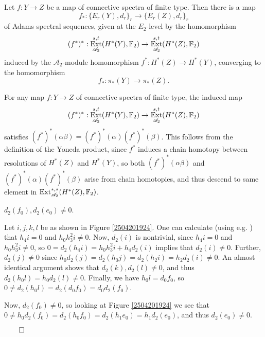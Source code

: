 \documentclass{MetricNotes2023}
\def\bb{\ensuremath\mathbb}
\def\A{\ensuremath{\mathscr{A}_2}}
\DeclareMathOperator{\Ext}{Ext}
\def\done{\begin{flushright}\vspace{-4.35ex}\(\qed\)\end{flushright}}
\begin{document}
\begin{theorem}\label{2504141019}
Let \(f : Y \to Z\) be a map of connective spectra of finite type. Then there is a map
\[f_* : \{E_r(Y), d_r\}_r \to \{E_r(Z), d_r\}_r\]
of Adams spectral sequences, given at the \(E_2\)-level by the homomorphism
\[(f^*)^* : \Ext_{\A}^{s,t}(H^*(Y), \bb{F}_2) \to \Ext^{s,t}_{\A}(H^*(Z), \bb{F}_2)\]
induced by the \(\A\)-module homomorphism \(f^* : H^*(Z)\to H^*(Y)\), converging to the homomorphism 
\[f_* : \pi_*(Y) \to \pi_*(Z).\]
\end{theorem}

\begin{remark}\label{2504211139}
For any map \(f : Y \to Z\) of connective spectra of finite type, the induced map 
\[(f^*)^* : \Ext_{\A}^{s,t}(H^*(Y), \bb{F}_2)\to \Ext^{s,t}_{\A}(H^*(Z), \bb{F}_2)\]
satisfies \((f^*)^*(\alpha \beta)=(f^*)^*(\alpha)(f^*)^*(\beta)\). This follows from the definition of the Yoneda product, since \(f^*\) induces a chain homotopy between resolutions of \(H^*(Z)\) and \(H^*(Y)\), so both \((f^*)^*(\alpha \beta)\) and \((f^*)^*(\alpha)(f^*)^*(\beta)\) arise from chain homotopies, and thus descend to same element in \(\Ext_{\A}^{*,*}(H^*(Z), \bb{F}_2)\).
\end{remark}

\begin{lemma}\label{2504192017}
\(d_2(f_0), d_2(e_0)\neq 0\).
\end{lemma}

\begin{ourproof}
Let \(i, j, k, l\) be as shown in Figure \ref{2504201924}. One can calculate (using e.g. \autocite{ext}) that \(h_4i=0\) and \(h_0h_3^2i\neq 0\). Now, \(d_2(i)\) is nontrivial, since \(h_4i=0\) and \(h_0h_3^2i\neq 0\), so \(0=d_2(h_4i)=h_0h_3^2i+h_4d_2(i)\) implies that \(d_2(i)\neq 0\). Further, \(d_2(j)\neq 0\) since \(h_0d_2(j)=d_2(h_0j)=d_2(h_2i)=h_2d_2(i)\neq 0\). An almost identical argument shows that \(d_2(k), d_2(l)\neq0\), and thus \(d_2(h_0l)=h_0d_2(l)\neq 0\). Finally, we have \(h_0l=d_0f_0\), so \(0\neq d_2(h_0l)=d_2(d_0f_0)=d_0d_2(f_0)\).

Now, \(d_2(f_0)\neq 0\), so looking at Figure \ref{2504201924} we see that \(0\neq h_0d_2(f_0)=d_2(h_0f_0)=d_2(h_1e_0)=h_1d_2(e_0)\), and thus \(d_2(e_0)\neq 0\).\done
\end{ourproof}
\end{document}

